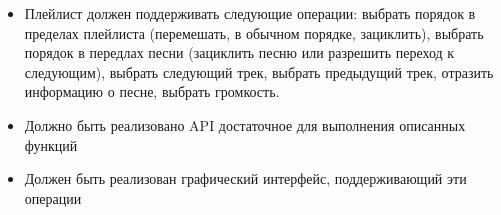 \documentclass[a4paper, 12pt, oneside]{article}
\begin{document}
\begin{itemize}
\begin{itemize}
		\item Плейлист должен поддерживать следующие операции: выбрать порядок в пределах плейлиста (перемешать, в обычном порядке, зациклить), выбрать порядок в передлах песни (зациклить песню или разрешить переход к следующим), выбрать следующий трек, выбрать предыдущий трек, отразить информацию о песне, выбрать громкость.
		\item Должно быть реализовано API достаточное для выполнения описанных функций
		\item Должен быть реализован графический интерфейс, поддерживающий эти операции
	\end{itemize}
	
\end{itemize}
\end{document}
